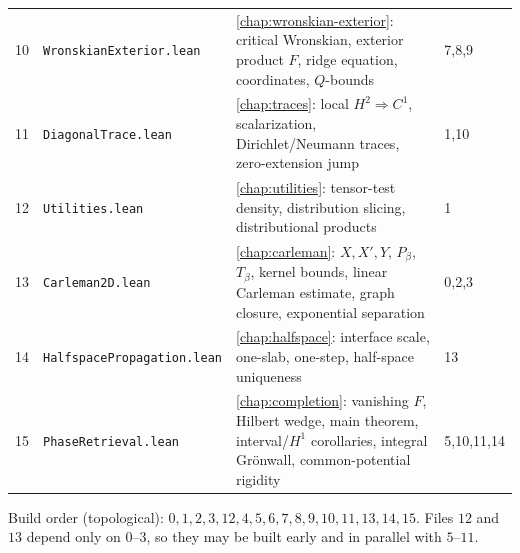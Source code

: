 \documentclass[11pt,oneside]{book}
\theoremstyle{definition}
\theoremstyle{remark}
\newcommand{\1}{\mathbf 1}
\begin{document}
\begin{longtable}{p{}p{}p{}p{}}
10 & \texttt{WronskianExterior.lean} & \cref{chap:wronskian-exterior}: critical Wronskian, exterior product $F$, ridge equation, coordinates, $Q$-bounds & 7,8,9 \\
11 & \texttt{DiagonalTrace.lean} & \cref{chap:traces}: local $H^2\!\Rightarrow\!C^1$, scalarization, Dirichlet/Neumann traces, zero-extension jump & 1,10 \\
12 & \texttt{Utilities.lean} & \cref{chap:utilities}: tensor-test density, distribution slicing, distributional products & 1 \\
13 & \texttt{Carleman2D.lean} & \cref{chap:carleman}: $X,X',Y$, $P_\beta$, $T_\beta$, kernel bounds, linear Carleman estimate, graph closure, exponential separation & 0,2,3 \\
14 & \texttt{HalfspacePropagation.lean} & \cref{chap:halfspace}: interface scale, one-slab, one-step, half-space uniqueness & 13 \\
15 & \texttt{PhaseRetrieval.lean} & \cref{chap:completion}: vanishing $F$, Hilbert wedge, main theorem, interval/$H^1$ corollaries, integral Gr\"onwall, common-potential rigidity & 5,10,11,14 \\
\bottomrule
\end{longtable}

\noindent Build order (topological): $0,1,2,3,12,4,5,6,7,8,9,10,11,13,14,15$. Files $12$ and $13$ depend only on
$0$--$3$, so they may be built early and in parallel with $5$--$11$.
\end{document}
